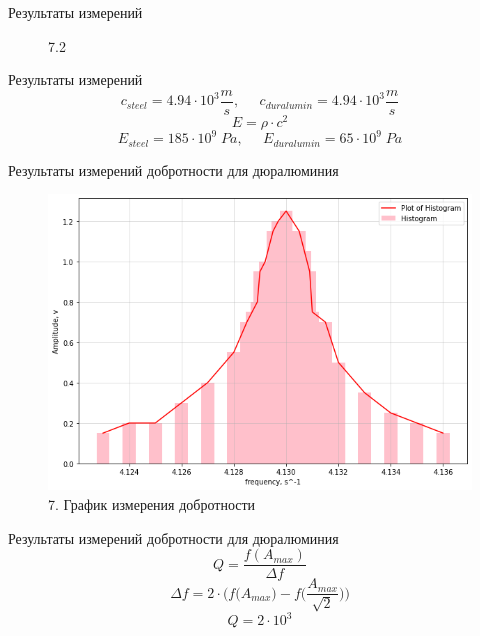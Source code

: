 \documentclass[xcolor=table]{beamer}
\begin{document}
\begin{frame}{Результаты измерений}
\begin{figure}[ht]
\begin{spacing}{0.25}
\begin{minipage}{.5\textwidth}
            \caption{7.2}
            \label{fig:my_label}
        \end{minipage}
        \end{spacing}
    \end{figure}
\end{frame}

\begin{frame}{Результаты измерений}
    $$c_{steel} = 4.94 \cdot 10^3 \frac{m}{s}, \;\;\;\;\; c_{duralumin} = 4.94 \cdot 10^3 \frac{m}{s}$$
    $$E = \rho \cdot c^2$$
    $$E_{steel} = 185 \cdot 10^9 \;Pa, \;\;\;\;\; E_{duralumin} = 65 \cdot 10^9 \;Pa$$
\end{frame}

\begin{frame}{Результаты измерений добротности для дюралюминия}
    \begin{figure}
        \centering
        \includegraphics[scale=0.45]{images/Chart1.png}
        \caption{7. График измерения добротности}
        \label{fig:my_label}
    \end{figure}
\end{frame}

\begin{frame}{Результаты измерений добротности для дюралюминия}
    $$Q = \frac{f(A_{max})}{\Delta f}$$
    $$\Delta f = 2 \cdot \bigg(f(A_{max}\bigg) - f\bigg(\frac{A_{max}}{\sqrt{2}}\bigg)\bigg)$$
    $$Q = 2 \cdot 10^3$$
\end{frame}
\end{document}
